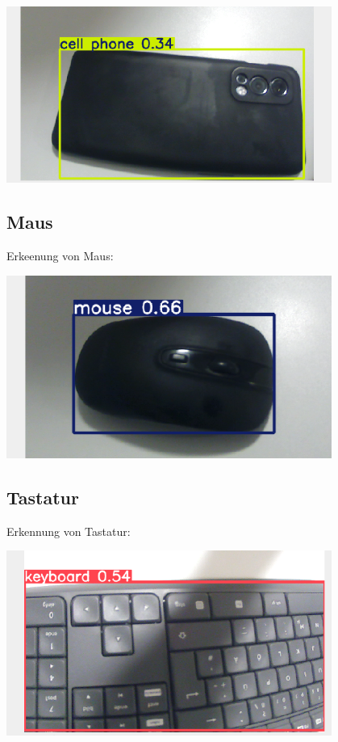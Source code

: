 \documentclass{article}
\begin{document}
\begin{center}
    \includegraphics[width=0.8\textwidth]{Bilder/handyErkennung.png}
\end{center}

\subsection{Maus}
Erkeenung von Maus:

\begin{center}
    \includegraphics[width=0.8\textwidth]{Bilder/mausErkennung.png}
\end{center}

\subsection{Tastatur}
Erkennung von Tastatur: 

\begin{center}
    \includegraphics[width=0.8\textwidth]{Bilder/tastaturErkennung.png}
\end{center}
\end{document}
